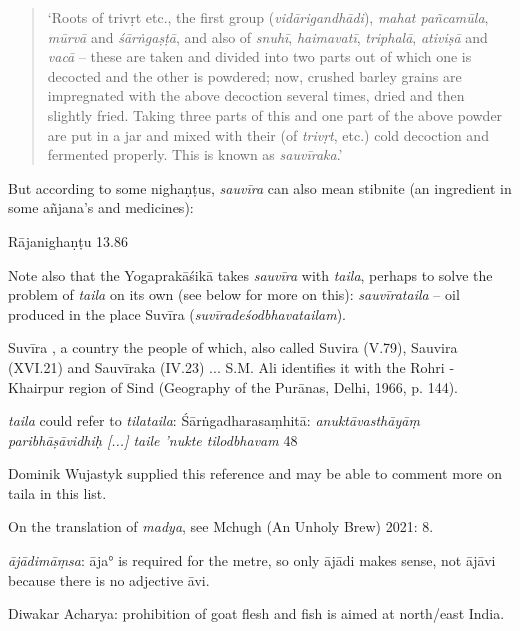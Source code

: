 \begin{ekdosis}
\begin{philcomm}[hp01_059]
\begin{quote}
‘Roots of trivṛt etc., the first group (\emph{vidārigandhādi}), \emph{mahat pañcamūla}, \emph{mūrvā} and \emph{śārṅgaṣṭā}, and also of \emph{snuhī}, \emph{haimavatī}, \emph{triphalā}, \emph{ativiṣā} and \emph{vacā} -- these are taken and divided into two parts out of which one is decocted and the other is powdered; now, crushed barley grains are impregnated with the above decoction several times, dried and then slightly fried. Taking three parts of this and one part of the above powder are put in a jar and mixed with their (of \emph{trivṛt}, etc.) cold decoction and fermented properly. This is known as \emph{sauvīraka}.’
\end{quote}

But according to some nighaṇṭus, \emph{sauvīra} can also mean stibnite (an ingredient in some añjana’s and medicines):

Rājanighaṇṭu 13.86

\begin{versinnote}
\end{versinnote}

Note also that the Yogaprakāśikā takes \emph{sauvīra} with \emph{taila}, perhaps to solve the problem of \emph{taila} on its own (see below for more on this): \emph{sauvīrataila} -- oil produced in the place Suvīra (\emph{suvīradeśodbhavatailam}).

Suvīra , a country the people of which, also called Suvira (V.79), Sauvira (XVI.21) and Sauvīraka (IV.23) ... S.M. Ali identifies it with the Rohri - Khairpur region of Sind (Geography of the Purānas, Delhi, 1966, p. 144).

\emph{taila} could refer to \emph{tilataila}:
Śārṅgadharasaṃhitā:
\emph{anuktāvasthāyāṃ paribhāṣāvidhiḥ [...] taile ’nukte tilodbhavam} 48

Dominik Wujastyk supplied this reference and may be able to comment more on taila in this list.

On the translation of \emph{madya}, see Mchugh (An Unholy Brew) 2021: 8.

\emph{ājādimāṃsa}: āja° is required for the metre, so only ājādi makes sense, not ājāvi because there is no adjective āvi.

Diwakar Acharya: prohibition of goat flesh and fish is aimed at north/east India.


\end{philcomm}
\end{ekdosis}
